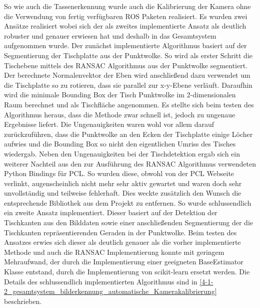 So wie auch die Tassenerkennung wurde auch die Kalibrierung der Kamera ohne die Verwendung von fertig verfügbaren ROS Paketen realisiert. Es wurden zwei Ansätze realisiert wobei sich der als zweites implementierte Ansatz als deutlich robuster und genauer erwiesen hat und deshalb in das Gesamtsystem aufgenommen wurde.
Der zunächst implementierte Algorithmus basiert auf der Segmentierung der Tischplatte aus der Punktwolke. So wird als erster Schritt die Tischebene mittels des RANSAC Algorithmus aus der Punktwolke segmentiert. Der berechnete Normalenvektor der Eben wird anschließend dazu verwendet um die Tischplatte so zu rotieren, dass sie parallel zur x-y-Ebene verläuft. Daraufhin wird die minimale Bounding Box der Tisch Punktwolke im 2-dimensionalen Raum berechnet und als Tischfläche angenommen. Es stellte sich beim testen des Algorithmus heraus, dass die Methode zwar schnell ist, jedoch zu ungenaue Ergebnisse liefert. Die Ungenauigkeiten waren wohl vor allem darauf zurückzuführen, dass die Punktwolke an den Ecken der Tischplatte einige Löcher aufwies und die Bounding Box so nicht den eigentlichen Umriss des Tisches wiedergab. Neben den Ungenauigkeiten bei der Tischdetektion ergab sich ein weiterer Nachteil aus den zur Ausführung des RANSAC Algorithmus verwendeten Python Bindings für PCL. So wurden diese, obwohl von der PCL Webseite verlinkt, augenscheinlich nicht mehr sehr aktiv gewartet und waren doch sehr unvollständig und teilweise fehlerhaft. Dies weckte zusätzlich den Wunsch die entsprechende Bibliothek aus dem Projekt zu entfernen.
So wurde schlussendlich ein zweite Ansatz implementiert. Dieser basiert auf der Detektion der Tischkanten aus den Bilddaten sowie einer anschließenden Segmentierung der die Tischkanten repräsentierenden Geraden in der Punktwolke. Beim testen des Ansatzes erwies sich dieser als deutlich genauer als die vorher implementierte Methode und auch die RANSAC Implementierung konnte mit geringem Mehraufwand, der durch die Implementierung einer geeigneten BaseEstimator Klasse entstand, durch die Implementierung von scikit-learn ersetzt werden. Die Details des schlussendlich implementierten Algorithmus sind in \ref{4-1-2_gesamtsystem_bilderkennung_automatische_Kamerakalibrierung} beschrieben.